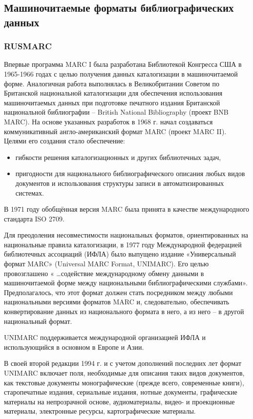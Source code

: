 \subsection{Машиночитаемые форматы библиографических данных}

\subsubsection*{RUSMARC}

Впервые программа MARC I была разработана Библиотекой Конгресса США в 1965-1966 годах с целью получения данных каталогизации в машиночитаемой форме. Аналогичная работа выполнялась в Великобритании Советом по Британской национальной каталогизации для обеспечения использования машиночитаемых данных при подготовке печатного издания Британской национальной библиографии -- British National Bibliography (проект BNB MARC). На основе указанных разработок в 1968 г. начал создаваться коммуникативный англо-американский формат MARC (проект MARC II). Целями его создания стало обеспечение:

\begin{itemize}
	\item гибкости решения каталогизационных и других библиотечных задач,
	\item пригодности для национального библиографического описания любых видов документов и использования структуры записи в автоматизированных системах.
\end{itemize}

В 1971 году обобщённая версия MARC была принята в качестве международного стандарта ISO 2709.

Для преодоления несовместимости национальных форматов, ориентированных на национальные правила каталогизации, в 1977 году Международной федерацией библиотечных ассоциаций (ИФЛА) было выпущено издание «Универсальный формат MARC» (Universal MARC Format, UNIMARC). Его целью провозглашено « …содействие международному обмену данными в машиночитаемой форме между национальными библиографическими службами». Предполагалось, что этот формат должен стать посредником между любыми национальными версиями форматов MARC и, следовательно, обеспечивать конвертирование данных из национального формата в него, а из него -- в другой национальный формат.

UNIMARC поддерживается международной организацией ИФЛА и использующийся в основном в Европе и Азии.

В своей второй редакции 1994 г. и с учетом дополнений последних лет формат UNIMARC включает поля, необходимые для описания таких видов документов, как текстовые документы монографические (прежде всего, современные книги), старопечатные издания, сериальные издания, нотные документы, графические материалы на непрозрачной основе, аудиоматериалы, видео- и проекционные материалы, электронные ресурсы, картографические материалы.

